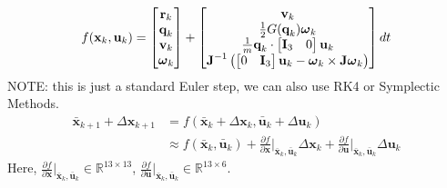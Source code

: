 \begin{equation}
    f(\textbf{x}_k,\textbf{u}_k) = \begin{bmatrix}
        \textbf{r}_k \\  \textbf{q}_k \\ \textbf{v}_k \\ \text{\boldmath$\omega$}_k
    \end{bmatrix} + \begin{bmatrix}
        \textbf{v}_k                                                         \\

        \frac{1}{2}G(\textbf{q}_k)\text{\boldmath$\omega$}_k                 \\

        \frac{1}{m}\textbf{q}_k \cdot \begin{bmatrix}
            \textbf{I}_3 & 0
        \end{bmatrix} \textbf{u}_k \\

        \textbf{J}^{-1}\left(\begin{bmatrix}
            0 & \textbf{I}_3
        \end{bmatrix} \textbf{u}_k - \text{\boldmath$\omega$}_k \times \textbf{J}\text{\boldmath$\omega$}_k \right)
    \end{bmatrix} dt
\end{equation}
NOTE: this is just a standard Euler step, we can also use RK4 or Symplectic Methods.
\begin{equation}
    \begin{aligned}
        \bar{\textbf{x}}_{k+1} + \Delta\textbf{x}_{k+1}
         & = f(\bar{\textbf{x}}_k + \Delta\textbf{x}_k, \bar{\textbf{u}}_k + \Delta\textbf{u}_k) \\
         & \approx f(\bar{\textbf{x}}_k, \bar{\textbf{u}}_k) +
        \frac{\partial f}{\partial \textbf{x}}\Big|_{\bar{\textbf{x}}_k, \bar{\textbf{u}}_k} \Delta\textbf{x}_k +
        \frac{\partial f}{\partial \textbf{u}}\Big|_{\bar{\textbf{x}}_k, \bar{\textbf{u}}_k} \Delta\textbf{u}_k
    \end{aligned}
\end{equation}
Here, $\frac{\partial f}{\partial \textbf{x}}\Big|_{\bar{\textbf{x}}_k, \bar{\textbf{u}}_k} \in \mathbb{R}^{13 \times 13} $, $\frac{\partial f}{\partial \textbf{u}}\Big|_{\bar{\textbf{x}}_k, \bar{\textbf{u}}_k} \in \mathbb{R}^{13 \times 6} $.

